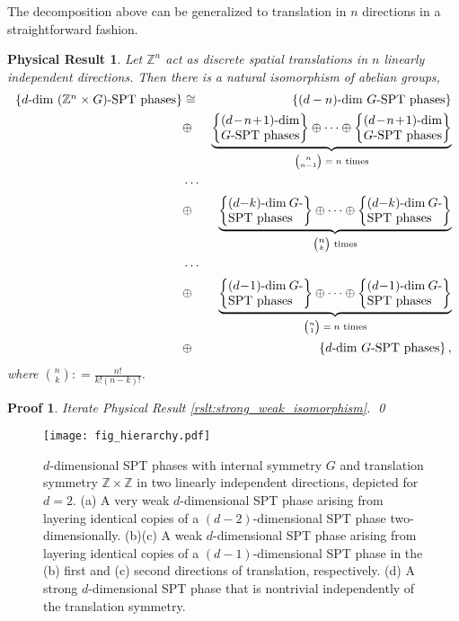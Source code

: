\documentclass[sort&compress]{elsarticle}
\theoremstyle{theoremstyle}
\theoremstyle{framedtheoremstyle}
\newtheorem{rslt}{Physical Result}
\theoremstyle{definitionstyle}
\theoremstyle{definitionstyle}
\theoremstyle{definitionstyle}
\theoremstyle{definitionstyle}
\theoremstyle{nameddefinitionstyle}
\theoremstyle{framednameddefinitionstyle}
\theoremstyle{proofstyle}
\newtheorem{pf}{Proof}
\theoremstyle{definitionstyle}
\newcommand{\ZZZ}{\mathbb{Z}}
\newcommand{\coloneq}{\mathrel{\mathop:}=}
\newcommand{\isomorphic}{\cong}
\newcommand{\braces}[1]{\left\{ #1 \right\}}
\begin{document}
The decomposition above can be generalized to translation in $n$ directions in a straightforward fashion.

\begin{framed}\begin{rslt}\label{rslt:hierarchy}
Let $\ZZZ^n$ act as discrete spatial translations in $n$ linearly independent directions. Then there is a natural isomorphism of abelian groups,
\begin{eqnarray}
\braces{\mbox{$d$-dim $(\ZZZ^n \times G)$-SPT phases}} 
&\isomorphic&
\braces{\mbox{$(d-n)$-dim $G$-SPT phases}} \nonumber\\
&\oplus&
\underbrace{
\braces{\parbox{2.2cm}{$(d-n+1)$-dim $G$-SPT phases}} \oplus \cdots \oplus \braces{\parbox{2.2cm}{$(d-n+1)$-dim $G$-SPT phases}}
}_{\text{${n \choose n-1} = n$~times}}
\nonumber\\
&\cdots&
\nonumber\\
&\oplus&
\underbrace{
\braces{\parbox{2.1cm}{$(d-k)$-dim $G$-SPT phases}} \oplus \cdots \oplus \braces{\parbox{2.1cm}{$(d-k)$-dim $G$-SPT phases}}
}_{\text{$n \choose k$~times}}
\nonumber\\
&\cdots&
\nonumber\\
&\oplus&
\underbrace{
\braces{\parbox{2.1cm}{$(d-1)$-dim $G$-SPT phases}} \oplus \cdots \oplus \braces{\parbox{2.1cm}{$(d-1)$-dim $G$-SPT phases}}
}_{\text{${n \choose 1} = n$~times}}
\nonumber\\
&\oplus&
\braces{\mbox{$d$-dim $G$-SPT phases}},
\end{eqnarray}
where ${n \choose k} \coloneq \frac{n!}{k! (n-k)!}$.
\end{rslt}\end{framed}

\begin{pf}
Iterate Physical Result \ref{rslt:strong_weak_isomorphism}.
\qed\end{pf}

\begin{figure}
    \centering
    \texttt{[image: fig\_hierarchy.pdf]}
    \caption{$d$-dimensional SPT phases with internal symmetry $G$ and translation symmetry $\ZZZ \times \ZZZ$ in two linearly independent directions, depicted for $d=2$. (a) A very weak $d$-dimensional SPT phase arising from layering identical copies of a $(d-2)$-dimensional SPT phase two-dimensionally. (b)(c) A weak $d$-dimensional SPT phase arising from layering identical copies of a $(d-1)$-dimensional SPT phase in the (b) first and (c) second directions of translation, respectively. (d) A strong $d$-dimensional SPT phase that is nontrivial independently of the translation symmetry.}
    \label{fig:hierarchy}
\end{figure}
\end{document}
